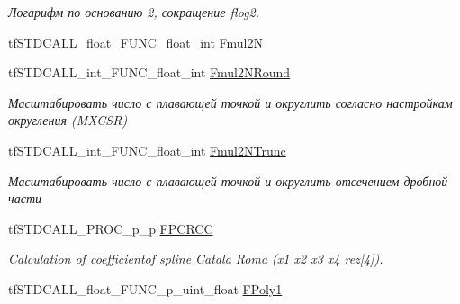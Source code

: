 \begin{DoxyCompactItemize}
\begin{DoxyCompactList}\small\item\em Логарифм по основанию 2, сокращение flog2. \end{DoxyCompactList}\item 
tf\-S\-T\-D\-C\-A\-L\-L\-\_\-float\-\_\-\-F\-U\-N\-C\-\_\-float\-\_\-int \hyperlink{structs_functions_math_c_p_u_a37478998a7e2ecb4850b9350133aadb9}{Fmul2\-N}
\item 
\hypertarget{structs_functions_math_c_p_u_a5d960568f79b2afe0ea9e5b3dee2a67f}{tf\-S\-T\-D\-C\-A\-L\-L\-\_\-int\-\_\-\-F\-U\-N\-C\-\_\-float\-\_\-int \hyperlink{structs_functions_math_c_p_u_a5d960568f79b2afe0ea9e5b3dee2a67f}{Fmul2\-N\-Round}}\label{structs_functions_math_c_p_u_a5d960568f79b2afe0ea9e5b3dee2a67f}

\begin{DoxyCompactList}\small\item\em Масштабировать число с плавающей точкой и округлить согласно настройкам округления (M\-X\-C\-S\-R) \end{DoxyCompactList}\item 
\hypertarget{structs_functions_math_c_p_u_ad119f896a44509e37c89fd3728da6b95}{tf\-S\-T\-D\-C\-A\-L\-L\-\_\-int\-\_\-\-F\-U\-N\-C\-\_\-float\-\_\-int \hyperlink{structs_functions_math_c_p_u_ad119f896a44509e37c89fd3728da6b95}{Fmul2\-N\-Trunc}}\label{structs_functions_math_c_p_u_ad119f896a44509e37c89fd3728da6b95}

\begin{DoxyCompactList}\small\item\em Масштабировать число с плавающей точкой и округлить отсечением дробной части \end{DoxyCompactList}\item 
\hypertarget{structs_functions_math_c_p_u_a644061541d47e645ace3b8cf952d9c51}{tf\-S\-T\-D\-C\-A\-L\-L\-\_\-\-P\-R\-O\-C\-\_\-p\-\_\-p \hyperlink{structs_functions_math_c_p_u_a644061541d47e645ace3b8cf952d9c51}{F\-P\-C\-R\-C\-C}}\label{structs_functions_math_c_p_u_a644061541d47e645ace3b8cf952d9c51}

\begin{DoxyCompactList}\small\item\em Calculation of coefficientof spline Catala Roma (x1 x2 x3 x4 rez\mbox{[}4\mbox{]}). \end{DoxyCompactList}\item 
\hypertarget{structs_functions_math_c_p_u_acdde1207f1ca781223316b183c68a1eb}{tf\-S\-T\-D\-C\-A\-L\-L\-\_\-float\-\_\-\-F\-U\-N\-C\-\_\-p\-\_\-uint\-\_\-float \hyperlink{structs_functions_math_c_p_u_acdde1207f1ca781223316b183c68a1eb}{F\-Poly1}}\label{structs_functions_math_c_p_u_acdde1207f1ca781223316b183c68a1eb}


\end{DoxyCompactItemize}
